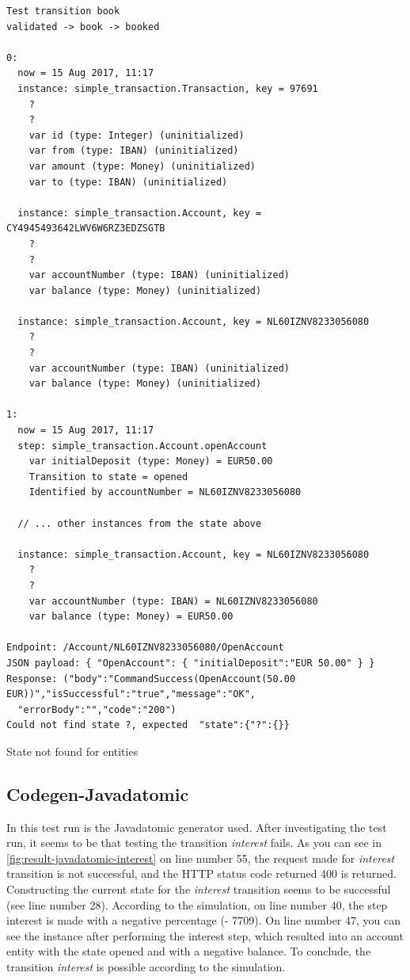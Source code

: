 \begin{sourcecode}[h!]
\begin{lstlisting}[]
Test transition book
validated -> book -> booked

0:
  now = 15 Aug 2017, 11:17
  instance: simple_transaction.Transaction, key = 97691
    ?
    ?
    var id (type: Integer) (uninitialized)
    var from (type: IBAN) (uninitialized)
    var amount (type: Money) (uninitialized)
    var to (type: IBAN) (uninitialized)

  instance: simple_transaction.Account, key = CY4945493642LWV6W6RZ3EDZSGTB
    ?
    ?
    var accountNumber (type: IBAN) (uninitialized)
    var balance (type: Money) (uninitialized)

  instance: simple_transaction.Account, key = NL60IZNV8233056080
    ?
    ?
    var accountNumber (type: IBAN) (uninitialized)
    var balance (type: Money) (uninitialized)

1:
  now = 15 Aug 2017, 11:17
  step: simple_transaction.Account.openAccount
    var initialDeposit (type: Money) = EUR50.00
    Transition to state = opened
    Identified by accountNumber = NL60IZNV8233056080

  // ... other instances from the state above

  instance: simple_transaction.Account, key = NL60IZNV8233056080
    ?
    ?
    var accountNumber (type: IBAN) = NL60IZNV8233056080
    var balance (type: Money) = EUR50.00

Endpoint: /Account/NL60IZNV8233056080/OpenAccount
JSON payload: { "OpenAccount": { "initialDeposit":"EUR 50.00" } }
Response: ("body":"CommandSuccess(OpenAccount(50.00 EUR))","isSuccessful":"true","message":"OK",
  "errorBody":"","code":"200")
Could not find state ?, expected  "state":{"?":{}}
\end{lstlisting}
\caption{State not found for entities}\label{fig:result-not-found-state}
\end{sourcecode}
\FloatBarrier

\subsection{Codegen-Javadatomic}\label{sec:bug-interest-javadatomic}

In this test run is the Javadatomic generator used. After investigating the test
run, it seems to be that testing the transition \textit{interest} fails. As you can see
in \autoref{fig:result-javadatomic-interest} on line number 55, the request made
for \textit{interest} transition is not successful, and the HTTP status code returned 400
is returned. Constructing the current state for the \textit{interest} transition seems to
be successful (see line number 28). According to the simulation, on line number
40, the step interest is made with a negative percentage (- 7709). On line
number 47, you can see the instance after performing the interest step, which
resulted into an account entity with the state opened and with a negative
balance. To conclude, the transition \textit{interest} is possible according to the
simulation.

